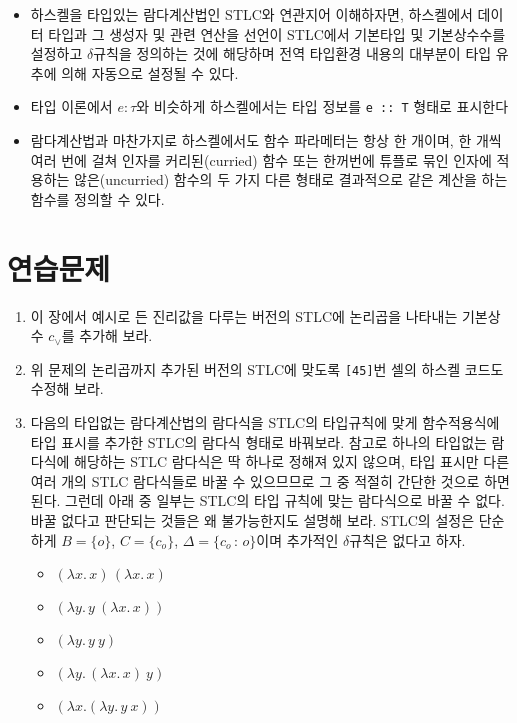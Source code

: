 \begin{itemize}
\item
  하스켈을 타입있는 람다계산법인 STLC와 연관지어 이해하자면, 하스켈에서
  데이터 타입과 그 생성자 및 관련 연산을 선언이 STLC에서 기본타입 및
  기본상수수를 설정하고 \(\delta\)규칙을 정의하는 것에 해당하며 전역
  타입환경 내용의 대부분이 타입 유추에 의해 자동으로 설정될 수 있다.
\item
  타입 이론에서 \(e:\tau\)와 비슷하게 하스켈에서는 타입 정보를
  \texttt{e\ ::\ T} 형태로 표시한다
\item
  람다계산법과 마찬가지로 하스켈에서도 함수 파라메터는 항상 한 개이며,
  한 개씩 여러 번에 걸쳐 인자를 커리된(curried) 함수 또는 한꺼번에
  튜플로 묶인 인자에 적용하는 않은(uncurried) 함수의 두 가지 다른 형태로
  결과적으로 같은 계산을 하는 함수를 정의할 수 있다.
\end{itemize}

\newpage

    \section*{연습문제}

\begin{enumerate}
\def\labelenumi{\arabic{enumi}.}
\tightlist
\item
  이 장에서 예시로 든 진리값을 다루는 버전의 STLC에 논리곱을 나타내는
  기본상수 \(c_\lor\)를 추가해 보라.
\item
  위 문제의 논리곱까지 추가된 버전의 STLC에 맞도록 \texttt{[45]}번 셀의
  하스켈 코드도 수정해 보라.
\item
  다음의 타입없는 람다계산법의 람다식을 STLC의 타입규칙에 맞게
  함수적용식에 타입 표시를 추가한 STLC의 람다식 형태로 바꿔보라. 참고로
  하나의 타입없는 람다식에 해당하는 STLC 람다식은 딱 하나로 정해져 있지
  않으며, 타입 표시만 다른 여러 개의 STLC 람다식들로 바꿀 수 있으므므로
  그 중 적절히 간단한 것으로 하면 된다. 그런데 아래 중 일부는 STLC의
  타입 규칙에 맞는 람다식으로 바꿀 수 없다. 바꿀 없다고 판단되는 것들은
  왜 불가능한지도 설명해 보라. STLC의 설정은 단순하게 \(B=\{o\}\),
  \(C=\{c_o\}\), \(\Delta=\{c_o{\,:\,}o\}\)이며 추가적인
  \(\delta\)규칙은 없다고 하자.

  \begin{itemize}
  \tightlist
  \item
    \((\lambda x.\, x)\,(\lambda x.\, x)\)
  \item
    \((\lambda y.\, y ~ (\lambda x.\, x))\)
  \item
    \((\lambda y.\, y ~ y)\)
  \item
    \((\lambda y.\, (\lambda x.\, x) ~ y)\)
  \item
    \((\lambda x.(\lambda y.\, y ~ x))\)
  \end{itemize}
\end{enumerate}

